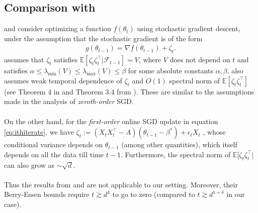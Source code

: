 \documentclass[11pt, reqno,english]{amsart}
\begin{document}
\subsection{Comparison with \cite{anastasiou2019normal, shao2022berry}}
\cite{anastasiou2019normal} and \cite{shao2022berry} consider optimizing a function $f(\theta_t)$ using stochastic gradient descent, under the assumption that the stochastic gradient is of the form
\begin{align*}
    g(\theta_{t-1}) = \nabla f(\theta_{t-1}) + \zeta_t.
\end{align*}
\cite{anastasiou2019normal} assumes that $\zeta_t$ satisfies $\mathbb{E}[\zeta_t \zeta^\top_t | \mathcal F_{t-1}] = V$, where $V$ does not depend on $t$ and satisfies $\alpha \leq \lambda_{\min}(V) \leq \lambda_{\max}(V) \leq \beta$ for some absolute constants $\alpha, \beta$. \cite{shao2022berry} also assumes weak temporal dependence of $\zeta_t$ and $O(1)$ spectral norm of $\mathbb{E}[\zeta_t \zeta^\top_t]$ (see Theorem 4 in \cite{anastasiou2019normal} and Theorem 3.4 from \cite{shao2022berry}). These are similar to the assumptions made in the analysis of \emph{zeroth-order} SGD. 
\\\\
On the other hand, for the \emph{first-order} online SGD update in equation \ref{eq:ithiterate}, we have $\zeta_t := (X_tX^\top_t - A)(\theta_{t-1} - \beta^*) + \epsilon_t X_t$ , whose conditional variance depends on $\theta_{t-1}$ (among other quantities), which itself depends on all the data till time $t-1$. Furthermore, the spectral norm of $\mathbb{E}[\zeta_t\zeta^\top_t|$ can also grow as $\sim \sqrt{d}$.
\\\\
Thus the results from \cite{anastasiou2019normal} and \cite{shao2022berry} are not applicable to our setting. Moreover, their Berry-Essen bounds require $t \gtrsim d^4$ to go to zero (compared to $t \gtrsim d^{1+\delta}$ in our case).
\end{document}
